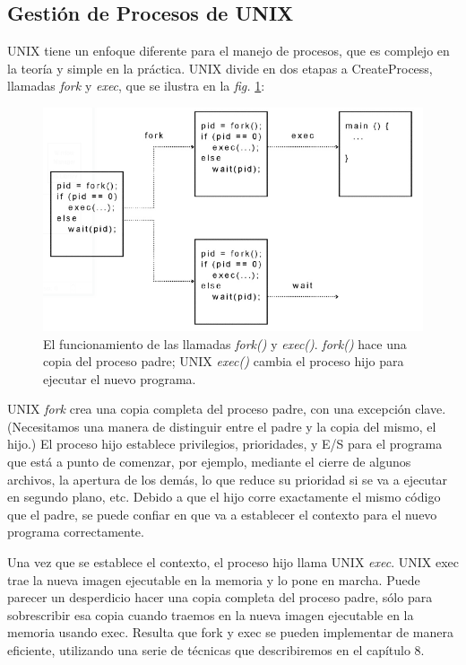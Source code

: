 \documentclass[10pt]{book}
\begin{document}
\subsection{Gestión de Procesos de UNIX}
UNIX tiene un enfoque diferente para el manejo de procesos, que es complejo en la teoría y simple en la práctica. UNIX divide en dos etapas a CreateProcess, llamadas \textit{fork} y \textit{exec}, que se ilustra en la \textit{fig.} \ref{fig13}:
\begin{figure}[tbhp]
\centerline{\includegraphics[scale=0.45]{img/fig13}}
\caption{El funcionamiento de las llamadas \textit{fork()} y \textit{exec()}. \textit{fork()} hace una copia del proceso padre; UNIX \textit{exec()} cambia el proceso hijo para ejecutar el nuevo programa.}
\label{fig13}
\end{figure}

UNIX \textit{fork} crea una copia completa del proceso padre, con una excepción clave. (Necesitamos una manera de distinguir entre el padre y la copia del mismo, el hijo.) El proceso hijo establece privilegios, prioridades, y E/S para el programa que está a punto de comenzar, por ejemplo, mediante el cierre de algunos archivos, la apertura de los demás, lo que reduce su prioridad si se va a ejecutar en segundo plano, etc. Debido a que el hijo corre exactamente el mismo código que el padre, se puede confiar en que va a establecer el contexto para el nuevo programa correctamente.

Una vez que se establece el contexto, el proceso hijo llama UNIX \textit{exec}. UNIX exec trae la nueva imagen ejecutable en la memoria y lo pone en marcha. Puede parecer un desperdicio hacer una copia completa del proceso padre, sólo para sobrescribir esa copia cuando traemos en la nueva imagen ejecutable en la memoria usando exec. Resulta que fork y exec se pueden implementar de manera eficiente, utilizando una serie de técnicas que describiremos en el capítulo 8.
\end{document}
